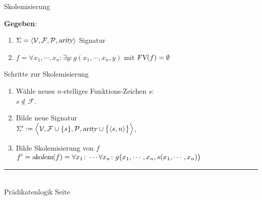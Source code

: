 \documentclass{slides}
\newcommand{\myrule}{\rule{20cm}{1mm}\\ }
\def\pair(#1,#2){\langle #1, #2 \rangle}
\newcommand{\FV}{\textsl{FV}}
\newcounter{mypage}
\begin{document}

\begin{slide}{}
\normalsize
\begin{center}
Skolemisierung
\end{center}
\vspace{0.5cm}

\footnotesize
\textbf{Gegeben}:
\begin{enumerate}
\item $\Sigma = \langle \mathcal{V}, \mathcal{F}, \mathcal{P}, \textsl{arity} \rangle$ Signatur
\item $f = \forall x_1, \cdots, x_n \colon \exists y \colon g(x_1, \cdots, x_n, y)$ \quad
      mit $\FV(f) = \emptyset$    
\end{enumerate}
Schritte zur Skolemisierung
\begin{enumerate}
\item W\"{a}hle neues $n$-stelliges Funktions-Zeichen $s$: \\[0.3cm]
      \hspace*{1.3cm} $s \not\in \mathcal{F}$.
\item Bilde neue Signatur \\[0.3cm]
      \hspace*{1.3cm} 
      $\Sigma' := \Bigl\langle \mathcal{V}, \mathcal{F} \cup \{s\}, \mathcal{P}, \textsl{arity} \cup \bigl\{\pair(s,n)\bigr\} \Bigr\rangle$, 
\item Bilde Skolemisierung von $f$ \\[0.3cm]
      $f' = \textsl{skolem}(f) = \forall x_1 \colon \cdots \forall x_n \colon g\bigl(x_1, \cdots, x_n, s(x_1,\cdots,x_n)\bigr)$\\[0.1cm]
\end{enumerate}


\vspace*{\fill}
\tiny \addtocounter{mypage}{1}
\myrule
Pr\"{a}dikatenlogik   \hspace*{\fill} Seite 
\end{slide}
\end{document}
